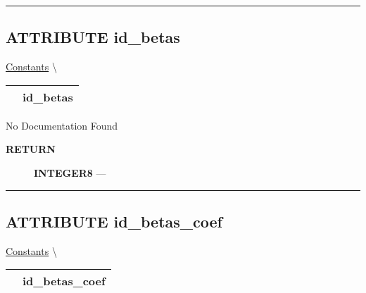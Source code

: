 \rule{\linewidth}{0.5pt}
\subsection*{\textsf{\colorbox{headtoc}{\color{white} ATTRIBUTE}
id\_betas}}

\hypertarget{ecldoc:constants.id_betas}{}
\hspace{0pt} \hyperlink{ecldoc:Constants}{Constants} \textbackslash 

{\renewcommand{\arraystretch}{1.5}
\begin{tabularx}{\textwidth}{|>{\raggedright\arraybackslash}l|X|}
\hline
\hspace{0pt}\mytexttt{\color{red} } & \textbf{id\_betas} \\
\hline
\end{tabularx}
}

\par





No Documentation Found








\par
\begin{description}
\item [\colorbox{tagtype}{\color{white} \textbf{\textsf{RETURN}}}] \textbf{INTEGER8} --- 
\end{description}




\rule{\linewidth}{0.5pt}
\subsection*{\textsf{\colorbox{headtoc}{\color{white} ATTRIBUTE}
id\_betas\_coef}}

\hypertarget{ecldoc:constants.id_betas_coef}{}
\hspace{0pt} \hyperlink{ecldoc:Constants}{Constants} \textbackslash 

{\renewcommand{\arraystretch}{1.5}
\begin{tabularx}{\textwidth}{|>{\raggedright\arraybackslash}l|X|}
\hline
\hspace{0pt}\mytexttt{\color{red} } & \textbf{id\_betas\_coef} \\
\hline
\end{tabularx}
}

\par





